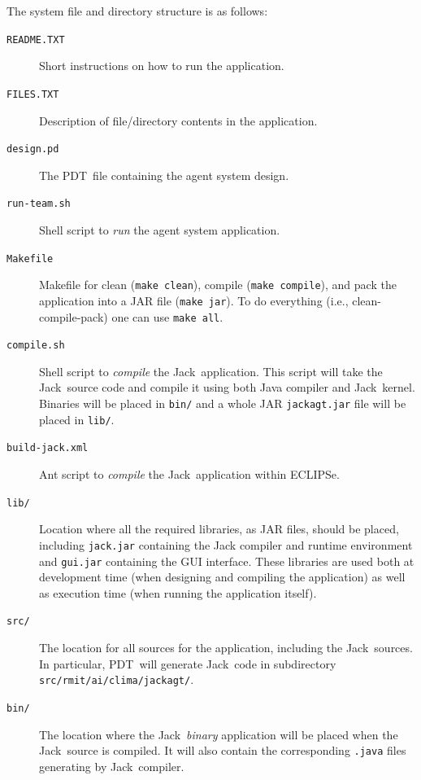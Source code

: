 \documentclass[10pt]{article}
\newcommand{\propername}[1]{\mbox{\sf #1}\xspace}
\newcommand{\JACK}{\propername{Jack}}
\newcommand{\PDT}{\propername{PDT}}
\newcommand{\ECLIPSE}{\propername{ECLIPSe}}
\begin{document}
The system file and directory structure is as follows:
\begin{description}

\item[\rm \texttt{README.TXT}] Short instructions on how to run the application.

\item[\rm \texttt{FILES.TXT}] Description of file/directory contents in the application.

\item[\rm \texttt{design.pd}] The \PDT\ file containing the agent system design. 

\item[\rm \texttt{run-team.sh}] Shell script to \textit{run} the agent system application. 

\item[\rm \texttt{Makefile}]  Makefile for clean (\texttt{make clean}), compile (\texttt{make compile}), and pack the application into a JAR file (\texttt{make jar}). To do everything (i.e., clean-compile-pack) one can use \texttt{make all}.

\item[\rm \texttt{compile.sh}] Shell script to \textit{compile} the \JACK\ application. This script will	take the	\JACK\ source code and compile it using both Java	compiler and \JACK\ kernel. Binaries will be placed in \texttt{bin/} and a whole JAR \texttt{jackagt.jar} file will be placed in \texttt{lib/}.

\item[\rm \texttt{build-jack.xml}] Ant script to \textit{compile} the \JACK\ application within \ECLIPSE.


 \item[\rm \texttt{lib/}] Location where all the required libraries, as JAR files, should be placed, including \texttt{jack.jar} containing the \JACK compiler and runtime environment and \texttt{gui.jar} containing the GUI interface. These libraries are used both at development time (when designing and compiling the application) as well as execution time (when running the application itself).
 
\item[\rm \texttt{src/}]   The location for all sources for the application, including the \JACK\ sources. In particular, \PDT\ will generate \JACK\ code in subdirectory \texttt{src/rmit/ai/clima/jackagt/}.


\item[\rm \texttt{bin/}]  The location where the \JACK\ \textit{binary} application will be placed when the \JACK\ source is compiled. It will also contain the corresponding \texttt{.java} files generating by \JACK\ compiler.

\end{description}
\end{document}
